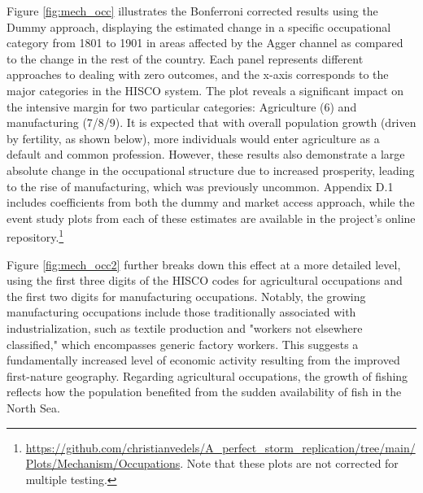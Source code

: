 \documentclass[11pt]{article}
\begin{document}
Figure \ref{fig:mech_occ} illustrates the Bonferroni corrected results using the Dummy approach, displaying the estimated change in a specific occupational category from 1801 to 1901 in areas affected by the Agger channel as compared to the change in the rest of the country. Each panel represents different approaches to dealing with zero outcomes, and the x-axis corresponds to the major categories in the HISCO system. The plot reveals a significant impact on the intensive margin for two particular categories: Agriculture (6) and manufacturing (7/8/9).  It is expected that with overall population growth (driven by fertility, as shown below), more individuals would enter agriculture as a default and common profession. However, these results also demonstrate a large absolute change in the occupational structure due to increased prosperity, leading to the rise of manufacturing, which was previously uncommon. Appendix D.1 includes coefficients from both the dummy and market access approach, while the event study plots from each of these estimates are available in the project's online repository.\footnote{
\url{https://github.com/christianvedels/A_perfect_storm_replication/tree/main/Plots/Mechanism/Occupations}. Note that these plots are not corrected for multiple testing. 
}

Figure \ref{fig:mech_occ2} further breaks down this effect at a more detailed level, using the first three digits of the HISCO codes for agricultural occupations and the first two digits for manufacturing occupations. Notably, the growing manufacturing occupations include those traditionally associated with industrialization, such as textile production and "workers not elsewhere classified," which encompasses generic factory workers. This suggests a fundamentally increased level of economic activity resulting from the improved first-nature geography. Regarding agricultural occupations, the growth of fishing reflects how the population benefited from the sudden availability of fish in the North Sea. 
\end{document}
